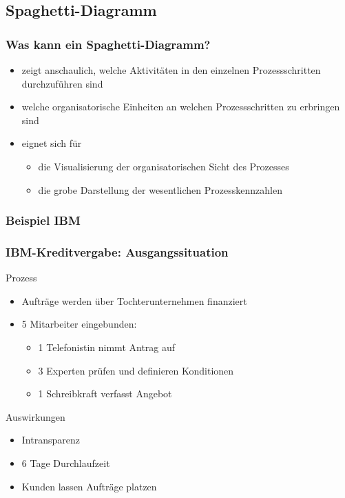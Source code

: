 \documentclass[xcolor=dvipsnames]{beamer}
\begin{document}
 \subsection[Spaghetti-Diagramm]{Spaghetti-Diagramm}
 \begin{frame}
  \frametitle{Was kann ein Spaghetti-Diagramm?  }

  \begin{itemize}
  \item zeigt anschaulich, welche Aktivitäten in den einzelnen Prozessschritten durchzuführen sind
  \item welche organisatorische Einheiten an welchen Prozessschritten zu erbringen sind
  \item eignet sich für
  \begin{itemize}
    \item die Visualisierung der organisatorischen Sicht des Prozesses
    \item die grobe Darstellung der wesentlichen Prozesskennzahlen
  \end{itemize}
  \end{itemize}

   \end{frame}


 \subsubsection[Beispiel IBM]{Beispiel IBM}
 \begin{frame}
  \frametitle{IBM-Kreditvergabe: Ausgangssituation}
  Prozess
  \begin{itemize}
    \item Aufträge werden über Tochterunternehmen finanziert
    \item 5 Mitarbeiter eingebunden:
    \begin{itemize}
      \item 1 Telefonistin nimmt Antrag auf
      \item 3 Experten prüfen und definieren Konditionen
      \item 1 Schreibkraft verfasst Angebot
    \end{itemize}
  \end{itemize}
  Auswirkungen
  \begin{itemize}
    \item Intransparenz
    \item 6 Tage Durchlaufzeit
    \item Kunden lassen Aufträge platzen
  \end{itemize}
 \end{frame}
\end{document}
